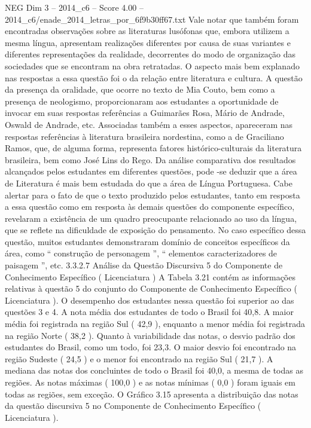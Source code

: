 \begin{textsample}{NEG Dim 3 – 2014\_c6 – Score 4.00 – 2014\_c6/enade\_2014\_letras\_por\_6f9b30ff67.txt}
Vale notar que também foram encontradas observações sobre as literaturas lusófonas que, embora utilizem a mesma língua, apresentam realizações diferentes por causa de suas variantes e diferentes representações da realidade, decorrentes do modo de organização das sociedades que se encontram na obra retratadas.
O aspecto mais bem explanado nas respostas a essa questão foi o da relação entre literatura e cultura.
A questão da presença da oralidade, que ocorre no texto de Mia Couto, bem como a presença de neologismo, proporcionaram aos estudantes a oportunidade de invocar em suas respostas referências a Guimarães Rosa, Mário de Andrade, Oswald de Andrade, etc.
Associadas também a esses aspectos, apareceram nas respostas referências à literatura brasileira nordestina, como a de Graciliano Ramos, que, de alguma forma, representa fatores histórico-culturais da literatura brasileira, bem como José Lins do Rego.
Da análise comparativa dos resultados alcançados pelos estudantes em diferentes questões, pode -se deduzir que a área de Literatura é mais bem estudada do que a área de Língua Portuguesa.
Cabe alertar para o fato de que o texto produzido pelos estudantes, tanto em resposta a essa questão como em resposta às demais questões do componente específico, revelaram a existência de um quadro preocupante relacionado ao uso da língua, que se reflete na dificuldade de exposição do pensamento.
No caso específico dessa questão, muitos estudantes demonstraram domínio de conceitos específicos da área, como “ construção de personagem ”, “ elementos caracterizadores de paisagem ”, etc. 3.3.2.7 Análise da Questão Discursiva 5 do Componente de Conhecimento Específico ( Licenciatura ) A Tabela 3.21 contém as informações relativas à questão 5 do conjunto do Componente de Conhecimento Específico ( Licenciatura ).
O desempenho dos estudantes nessa questão foi superior ao das questões 3 e 4.
A nota média dos estudantes de todo o Brasil foi 40,8.
A maior média foi registrada na região Sul ( 42,9 ), enquanto a menor média foi registrada na região Norte ( 38,2 ).
Quanto à variabilidade das notas, o desvio padrão dos estudantes do Brasil, como um todo, foi 23,3.
O maior desvio foi encontrado na região Sudeste ( 24,5 ) e o menor foi encontrado na região Sul ( 21,7 ).
A mediana das notas dos concluintes de todo o Brasil foi 40,0, a mesma de todas as regiões.
As notas máximas ( 100,0 ) e as notas mínimas ( 0,0 ) foram iguais em todas as regiões, sem exceção.
O Gráfico 3.15 apresenta a distribuição das notas da questão discursiva 5 no Componente de Conhecimento Específico ( Licenciatura ).

\end{textsample}
